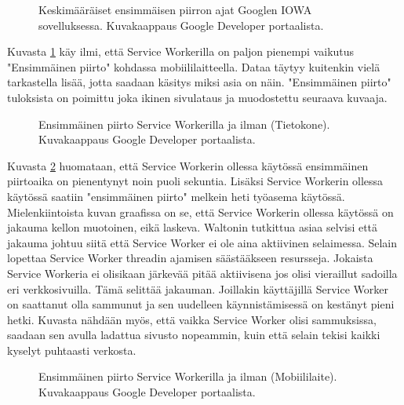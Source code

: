 \documentclass{tktltiki}
\begin{document}
\begin{figure}[!h]
\begin{center}
\caption{Keskimääräiset ensimmäisen piirron ajat Googlen IOWA sovelluksessa. Kuvakaappaus Google Developer portaalista.}
\label{Google AVG load times 1}
\end{center}
\end{figure}

Kuvasta \ref{Google AVG load times 1} käy ilmi, että Service Workerilla on paljon pienempi vaikutus "Ensimmäinen piirto" kohdassa mobiililaitteella. Dataa täytyy kuitenkin vielä tarkastella lisää, jotta saadaan käsitys miksi asia on näin. "Ensimmäinen piirto" tuloksista on poimittu joka ikinen sivulataus ja muodostettu seuraava kuvaaja.

\begin{figure}[h]
\begin{center}
\caption{Ensimmäinen piirto Service Workerilla ja ilman (Tietokone). Kuvakaappaus Google Developer portaalista.}
\label{Google AVG load times 2}
\end{center}
\end{figure}

Kuvasta \ref{Google AVG load times 2} huomataan, että Service Workerin ollessa käytössä ensimmäinen piirtoaika on pienentynyt noin puoli sekuntia. Lisäksi Service Workerin ollessa käytössä saatiin "ensimmäinen piirto" melkein heti työasema käytössä. Mielenkiintoista kuvan graafissa on se, että Service Workerin ollessa käytössä on jakauma kellon muotoinen, eikä laskeva. Waltonin tutkittua asiaa selvisi että jakauma johtuu siitä että Service Worker ei ole aina aktiivinen selaimessa. Selain lopettaa Service Worker threadin ajamisen säästääkseen resursseja. Jokaista Service Workeria ei olisikaan järkevää pitää aktiivisena jos olisi vieraillut sadoilla eri verkkosivuilla. Tämä selittää jakauman. Joillakin käyttäjillä Service Worker on saattanut olla sammunut ja sen uudelleen käynnistämisessä on kestänyt pieni hetki. Kuvasta  nähdään myös, että vaikka Service Worker olisi sammuksissa, saadaan sen avulla ladattua sivusto nopeammin, kuin että selain tekisi kaikki kyselyt puhtaasti verkosta. 

\clearpage

\begin{figure}[h]
\begin{center}
\caption{Ensimmäinen piirto Service Workerilla ja ilman (Mobiililaite). Kuvakaappaus Google Developer portaalista.}
\label{Google AVG load times 3}
\end{center}
\end{figure}
\end{document}
